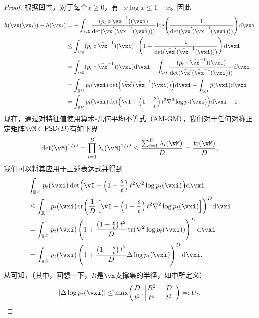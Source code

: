 \documentclass[../../book-main_zh.tex]{subfiles}
\begin{document}
\begin{proof}
    根据凹性，对于每个\(x \geq 0\)，有\(-x\log x \leq 1 - x\)。因此
    \begin{align}
        h(\bar{\vx}(\vx_{t})) - h(\vx_{t})
        &= - \int_{\cX}\frac{(p_{t} \circ \bar{\vx}^{-1})(\vxi)}{\det(\bar{\vx}^{\prime}(\bar{\vx}^{-1}(\vxi)))}\log\rp{\frac{1}{\det(\bar{\vx}^{\prime}(\bar{\vx}^{-1}(\vxi)))}}\odif{\vxi} \\ 
        &\leq  \int_{\cX}(p_{t} \circ \bar{\vx}^{-1})(\vxi)\cdot \bp{1 - \frac{1}{\det(\bar{\vx}^{\prime}(\bar{\vx}^{-1}(\vxi)))}}\odif{\vxi} \\ 
        &= \int_{\cX}(p_{t} \circ \bar{\vx}^{-1})(\vxi)\odif{\vxi} - \int_{\cX}\frac{(p_{t} \circ \bar{\vx}^{-1})(\vxi)}{\det(\bar{\vx}^{\prime}(\bar{\vx}^{-1}(\vxi)))}\odif{\vxi} \\
        &= \int_{\R^{D}}p_{t}(\vxi)\det\rp{\bar{\vx}^{\prime}(\bar{\vx}^{-1}(\vxi))}\odif{\vxi} - \int_{\cX}\bar{p}(\vxi)\odif{\vxi} \\
        &= \int_{\R^{D}}p_{t}(\vxi)\det\rp{\vI + \bp{1 - \frac{s}{t}}t^{2}\nabla^{2}\log p_{t}(\vxi)}\odif{\vxi} - 1.
    \end{align}
    现在，通过对特征值使用算术-几何平均不等式（AM-GM），我们对于任何对称正定矩阵\(\vM \in \PSD(D)\)有如下界
    \begin{equation}
        \det(\vM)^{1/D} = \prod_{i = 1}^{D}\lambda_{i}(\vM)^{1/D} \leq \frac{\sum_{i = 1}^{D}\lambda_{i}(\vM)}{D} = \frac{\tr(\vM)}{D},
    \end{equation}
    我们可以将其应用于上述表达式并得到
    \begin{align}
        &\int_{\R^{D}}p_{t}(\vxi)\det\rp{\vI + \bp{1 - \frac{s}{t}}t^{2}\nabla^{2}\log p_{t}(\vxi)}\odif{\vxi} \\
        &\leq \int_{\R^{D}} p_{t}(\vxi) \tr\rp{\frac{1}{D}\bs{\vI + \bp{1 - \frac{s}{t}}t^{2}\nabla^{2}\log p_{t}(\vxi)}}^{D}\odif{\vxi} \\
        &= \int_{\R^{D}} p_{t}(\vxi)\bp{1 + \frac{\bp{1 - \frac{s}{t}}t^{2}}{D}\tr(\nabla^{2}\log p_{t}(\vxi))}^{D}\odif{\vxi} \\
        &= \int_{\R^{D}} p_{t}(\vxi)\bp{1 + \frac{\bp{1 - \frac{s}{t}}t^{2}}{D}\Delta \log p_{t}(\vxi)}^{D}\odif{\vxi}.
    \end{align}
    从可知，（其中，回想一下，\(R\)是\(\vx\)支撑集的半径，如中所定义）
    \begin{equation}
        \abs{\Delta \log p_{t}(\vxi)} \leq \max\rp{\frac{D}{t^{2}}, \abs*{\frac{R^{2}}{t^{4}} - \frac{D}{t^{2}}}} =: U_{t}.

\end{equation}
\end{proof}
\end{document}

